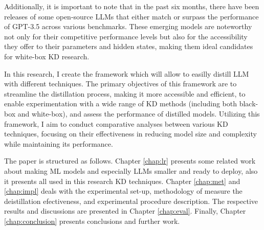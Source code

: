 Additionally, it is important to note that in the past six months, there have been releases of some open-source LLMs that either match or surpass the performance of GPT-3.5 across various benchmarks. These emerging models are noteworthy not only for their competitive performance levels but also for the accessibility they offer to their parameters and hidden states, making them ideal candidates for white-box KD research.

In this research, I create the framework which will allow to easilly distill LLM with different techniques. The primary objectives of this framework are to streamline the distillation process, making it more accessible and efficient, to enable experimentation with a wide range of KD methods (including both black-box and white-box), and assess the performance of distilled models. Utilizing this framework, I aim to conduct comparative analyses between various KD techniques, focusing on their effectiveness in reducing model size and complexity while maintaining its performance.

The paper is structured as follows. Chapter \ref{chap:lr} presents some related work about making ML models and especially LLMs smaller and ready to deploy, also it presents all used in this research KD techniques. Chapter \ref{chap:met} and \ref{chap:impl} deals with the experimental set-up, methodology of measure the deistillation efectiveness, and experimental procedure description. The respective results and discussions are presented in Chapter \ref{chap:eval}. Finally, Chapter \ref{chap:conclusion} presents conclusions and further work.
